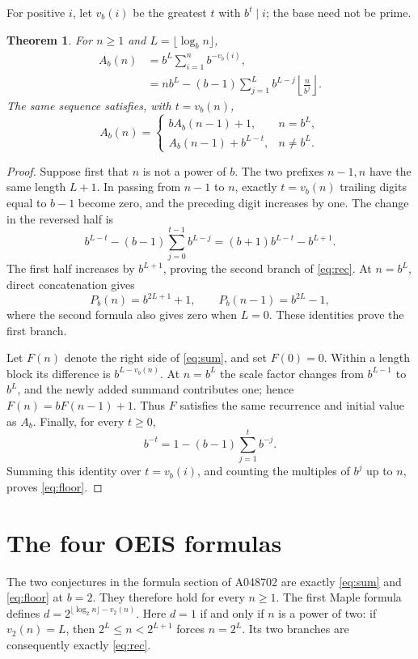\documentclass[10pt]{article}
\newtheorem{theorem}{Theorem}
\begin{document}
For positive $i$, let $v_b(i)$ be the greatest $t$ with $b^t\mid i$;
the base need not be prime.
\begin{theorem}\label{thm:general}
For $n\ge1$ and $L=\lfloor\log_b n\rfloor$,
\begin{align}
 A_b(n)&=b^L\sum_{i=1}^{n}b^{-v_b(i)},\label{eq:sum}\\
 &=n b^L-(b-1)\sum_{j=1}^{L}b^{L-j}
                 \left\lfloor\frac{n}{b^j}\right\rfloor.\label{eq:floor}
\end{align}
The same sequence satisfies, with $t=v_b(n)$,
\begin{equation}\label{eq:rec}
 A_b(n)=
 \begin{cases}
 bA_b(n-1)+1,&n=b^L,\\
 A_b(n-1)+b^{L-t},&n\ne b^L.
 \end{cases}
\end{equation}
\end{theorem}
\begin{proof}
Suppose first that $n$ is not a power of $b$. The two prefixes $n-1,n$
have the same length $L+1$. In passing from $n-1$ to $n$, exactly
$t=v_b(n)$ trailing digits equal to $b-1$ become zero, and the preceding
digit increases by one. The change in the reversed half is
\[
 b^{L-t}-(b-1)\sum_{j=0}^{t-1}b^{L-j}
       =(b+1)b^{L-t}-b^{L+1}.
\]
The first half increases by $b^{L+1}$, proving the second branch of
\eqref{eq:rec}. At $n=b^L$, direct concatenation gives
\[
 P_b(n)=b^{2L+1}+1,\qquad P_b(n-1)=b^{2L}-1,
\]
where the second formula also gives zero when $L=0$. These identities
prove the first branch.

Let $F(n)$ denote the right side of \eqref{eq:sum}, and set $F(0)=0$.
Within a length block its difference is $b^{L-v_b(n)}$. At $n=b^L$
the scale factor changes from $b^{L-1}$ to $b^L$, and the newly added
summand contributes one; hence $F(n)=bF(n-1)+1$. Thus $F$ satisfies
the same recurrence and initial value as $A_b$.
Finally, for every $t\ge0$,
\[
 b^{-t}=1-(b-1)\sum_{j=1}^{t}b^{-j}.
\]
Summing this identity over $t=v_b(i)$, and counting the multiples of
$b^j$ up to $n$, proves \eqref{eq:floor}.
\end{proof}

\section{The four OEIS formulas}
The two conjectures in the formula section of A048702 are exactly
\eqref{eq:sum} and \eqref{eq:floor} at $b=2$. They therefore hold for
every $n\ge1$. The first Maple formula defines
$d=2^{\lfloor\log_2 n\rfloor-v_2(n)}$. Here $d=1$ if and only if
$n$ is a power of two: if $v_2(n)=L$, then $2^L\le n<2^{L+1}$
forces $n=2^L$. Its two branches are consequently exactly
\eqref{eq:rec}.
\end{document}

